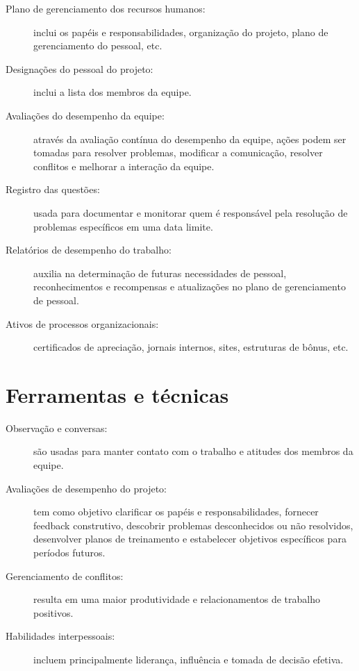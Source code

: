 \begin{description}

	\item[Plano de gerenciamento dos recursos humanos:] inclui os papéis e responsabilidades, organização do projeto, plano de gerenciamento do pessoal, etc.
	
	\item[Designações do pessoal do projeto:] inclui a lista dos membros da equipe.
	
	\item[Avaliações do desempenho da equipe:] através da avaliação contínua do desempenho da equipe, ações podem ser tomadas para resolver problemas, modificar a comunicação, resolver conflitos e melhorar a interação da equipe.
	
	\item[Registro das questões:] usada para documentar e monitorar quem é responsável pela resolução de problemas específicos em uma data limite.
	
	\item[Relatórios de desempenho do trabalho:] auxilia na determinação de futuras necessidades de pessoal, reconhecimentos e recompensas e atualizações no plano de gerenciamento de pessoal.
	
	\item[Ativos de processos organizacionais:] certificados de apreciação, jornais internos, sites, estruturas de bônus, etc.
	
\end{description}

\section{Ferramentas e técnicas}

\begin{description}

	\item[Observação e conversas:] são usadas para manter contato com o trabalho e atitudes dos membros da equipe.
	
	\item[Avaliações de desempenho do projeto:] tem como objetivo clarificar os papéis e responsabilidades, fornecer feedback construtivo, descobrir problemas desconhecidos ou não resolvidos, desenvolver planos de treinamento e estabelecer objetivos específicos para períodos futuros.
	
	\item[Gerenciamento de conflitos:] resulta em uma maior produtividade e relacionamentos de trabalho positivos.
	
	\item[Habilidades interpessoais:] incluem principalmente liderança, influência e tomada de decisão efetiva.
		
\end{description}

